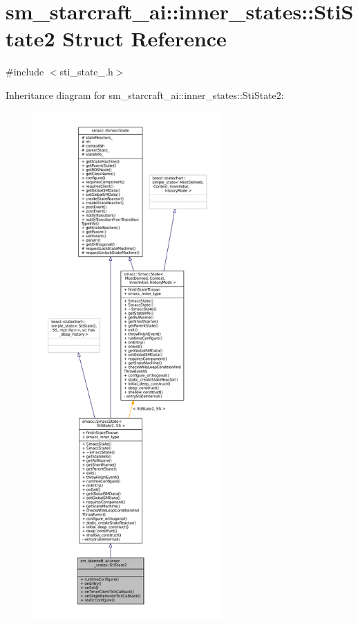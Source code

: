 \hypertarget{structsm__starcraft__ai_1_1inner__states_1_1StiState2}{}\section{sm\+\_\+starcraft\+\_\+ai\+:\+:inner\+\_\+states\+:\+:Sti\+State2 Struct Reference}
\label{structsm__starcraft__ai_1_1inner__states_1_1StiState2}


{\ttfamily \#include $<$sti\+\_\+state\+\_.\+h$>$}



Inheritance diagram for sm\+\_\+starcraft\+\_\+ai\+:\+:inner\+\_\+states\+:\+:Sti\+State2\+:
\nopagebreak
\begin{figure}[H]
\begin{center}
\leavevmode
\includegraphics[height=550pt]{structsm__starcraft__ai_1_1inner__states_1_1StiState2__inherit__graph}
\end{center}
\end{figure}


